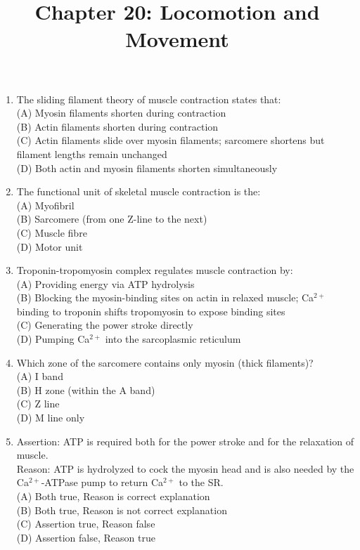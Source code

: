 \documentclass{article}
\begin{document}
\title{Chapter 20: Locomotion and Movement}
\date{}
\maketitle

\begin{enumerate}[label=Q\arabic*.]

\item The sliding filament theory of muscle contraction states that:
\\(A) Myosin filaments shorten during contraction
\\(B) Actin filaments shorten during contraction
\\(C) Actin filaments slide over myosin filaments; sarcomere shortens but filament lengths remain unchanged
\\(D) Both actin and myosin filaments shorten simultaneously

\item The functional unit of skeletal muscle contraction is the:
\\(A) Myofibril
\\(B) Sarcomere (from one Z-line to the next)
\\(C) Muscle fibre
\\(D) Motor unit

\item Troponin-tropomyosin complex regulates muscle contraction by:
\\(A) Providing energy via ATP hydrolysis
\\(B) Blocking the myosin-binding sites on actin in relaxed muscle; Ca$^{2+}$ binding to troponin shifts tropomyosin to expose binding sites
\\(C) Generating the power stroke directly
\\(D) Pumping Ca$^{2+}$ into the sarcoplasmic reticulum

\item Which zone of the sarcomere contains only myosin (thick filaments)?
\\(A) I band
\\(B) H zone (within the A band)
\\(C) Z line
\\(D) M line only

\item Assertion: ATP is required both for the power stroke and for the relaxation of muscle.\\
Reason: ATP is hydrolyzed to cock the myosin head and is also needed by the Ca$^{2+}$-ATPase pump to return Ca$^{2+}$ to the SR.
\\(A) Both true, Reason is correct explanation
\\(B) Both true, Reason is not correct explanation
\\(C) Assertion true, Reason false
\\(D) Assertion false, Reason true


\end{enumerate}
\end{document}
